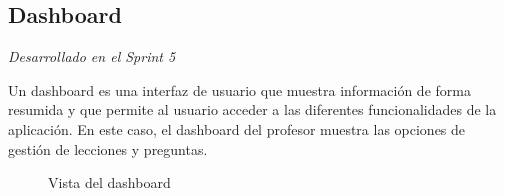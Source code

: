 \subsection{Dashboard}

\textit{Desarrollado en el Sprint 5}
\label{sec:dashboard}

Un dashboard es una interfaz de usuario que muestra información de forma resumida y que permite al usuario acceder a las diferentes funcionalidades de la aplicación.
 En este caso, el dashboard del profesor muestra las opciones de gestión de lecciones y preguntas.


\begin{figure}[H]%
  \centering
  \qquad
  \caption{Vista del dashboard}%
  \label{fig:dashboard}%
\end{figure}

